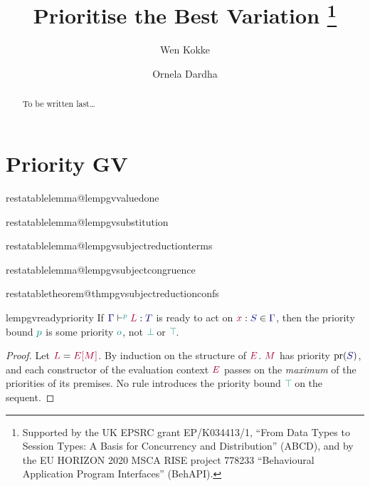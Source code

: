 \documentclass[citecolor=red,linkcolor=blue,runningheads]{llncs}
\makeatletter
\newcommand{\onlyinsubfile}[1]{#1}
\newcommand{\notinsubfile}[1]{}
\newcommand{\restatetheorem}[1]{%
  \begingroup
  \renewcommand{\thetheorem}{\ref{#1}}%
  \expandafter\expandafter\expandafter\theorem
  \csname restatabletheorem@#1\endcsname
  \endtheorem
  \endgroup
}
\newcommand{\restatelemma}[1]{%
  \begingroup
  \renewcommand{\thelemma}{\ref{#1}}%
  \expandafter\expandafter\expandafter\lemma
  \csname restatablelemma@#1\endcsname
  \endlemma
  \endgroup
}
\newcommand{\tm}[1]{\ensuremath{{\color[HTML]{a40038}#1}}}
\newcommand{\ty}[1]{\ensuremath{{\color[HTML]{00007a}#1}}}
\newcommand{\cs}[1]{\ensuremath{{\color[HTML]{009180}#1}}}
\newcommand{\tmty}[2]{\ensuremath{\tm{#1}:\ty{#2}}}
\newcommand{\plug}[2]{\ensuremath{#1[#2]}}
\DeclareMathOperator{\pr}{pr}
\providecommand{\pbot}[0]{\ensuremath{{\bot\!}}}
\providecommand{\ptop}[0]{\ensuremath{{\top\!}}}
\providecommand{\tseq}[4][]{\ensuremath{#2\vdash^{#1}\tmty{#3}{#4}}}
\makeatother
\begin{document}
%
\renewcommand{\onlyinsubfile}[1]{}
\renewcommand{\notinsubfile}[1]{#1}
%
\title{Prioritise the Best Variation%
  \thanks{Supported by the UK EPSRC grant EP/K034413/1, ``From Data Types to Session Types: A Basis for Concurrency and Distribution'' (ABCD), and by the EU HORIZON 2020 MSCA RISE project 778233 ``Behavioural Application Program Interfaces'' (BehAPI).}
}
%
\author{
  Wen Kokke%
  \and%
  Ornela Dardha%
  }
%
%
%
\maketitle
%
\begin{abstract}
To be written last\dots
{}
\end{abstract}










\clearpage\appendix
\changetext{}{10em}{-5em}{-5em}{}
\section{Priority GV}
{

  

  \restatelemma{lempgvvaluedone}
  

  \restatelemma{lempgvsubstitution}
  

  \restatelemma{lempgvsubjectreductionterms}
  

  \restatelemma{lempgvsubjectcongruence}
  

  \restatetheorem{thmpgvsubjectreductionconfs}
  

  \begin{restatablelemma}{lempgvreadypriority}
    \label{lem:pgv-ready-priority}
    If $\tseq[\cs{p}]{\ty{\Gamma}}{L}{T}$ is ready to act on $\tmty{x}{S}\in\ty{\Gamma}$, then the priority bound $\cs{p}$ is some priority $\cs{o}$, \ie not $\cs{\pbot}$ or $\cs{\ptop}$.
  \end{restatablelemma}
  \begin{proof}
    Let $\tm{L}=\tm{\plug{E}{M}}$. By induction on the structure of $\tm{E}$. $\tm{M}$ has priority $\pr({\ty{S}})$, and each constructor of the evaluation context $\tm{E}$ passes on the \emph{maximum} of the priorities of its premises. No rule introduces the priority bound $\cs{\ptop}$ on the sequent.
  \end{proof}
}
\end{document}
